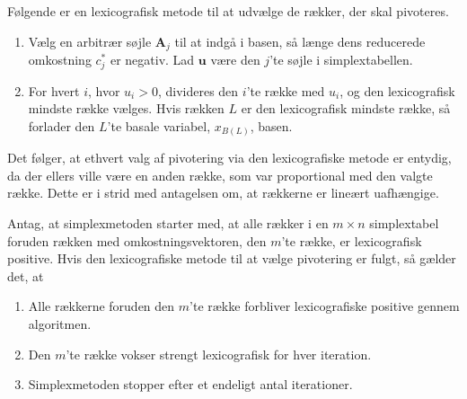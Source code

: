 %
Følgende er en lexicografisk metode til at udvælge de rækker, der skal pivoteres.
\begin{enumerate}
\item Vælg en arbitrær søjle $\textbf{A}_j$ til at indgå i basen, så længe dens reducerede omkostning $c_j^*$ er negativ.
Lad $\textbf{u}$ være den $j$'te søjle i simplextabellen.
\item For hvert $i$, hvor $u_i>0$, divideres den $i$'te række med $u_i$, og den lexicografisk mindste række vælges. 
Hvis rækken $L$ er den lexicografisk mindste række, så forlader den $L$'te basale variabel, $x_{B(L)}$, basen.
\end{enumerate}
%
Det følger, at ethvert valg af pivotering via den lexicografiske metode er entydig, da der ellers ville være en anden række, som var proportional med den valgte række. 
Dette er i strid med antagelsen om, at rækkerne er lineært uafhængige.
%
\begin{thm}{}{}
Antag, at simplexmetoden starter med, at alle rækker i en $m \times n$ simplextabel foruden rækken med omkostningsvektoren, den $m$'te række, er lexicografisk positive.
Hvis den lexicografiske metode til at vælge pivotering er fulgt, så gælder det, at
%
\begin{enumerate}[label=(\alph*)]
\item Alle rækkerne foruden den $m$'te række forbliver lexicografiske positive gennem algoritmen.
\item Den $m$'te række vokser strengt lexicografisk for hver iteration.
\item Simplexmetoden stopper efter et endeligt antal iterationer. 
\end{enumerate}
\end{thm}
%
